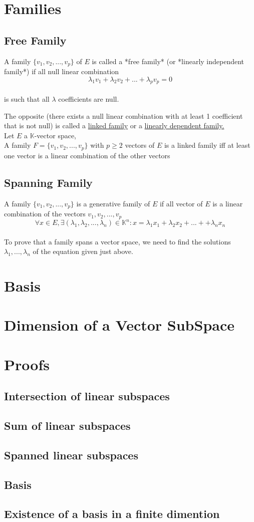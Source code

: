\documentclass[notitlepage]{math}
\begin{document}
\section{Families}
\subsection{Free Family}
A family $\{v_1,v_2,...,v_p\}$  of $E$ is called a *free family*  (or *linearly independent family*) if all null linear combination\\
\[\lambda_1v_1 + \lambda_2v_2 + ... + \lambda_pv_p = 0\]\\
is such that all $\lambda$ coefficients are null.

The opposite (there exists a null linear combination with at least 1 coefficient that is not null) is called a \underline{linked family} or a \underline{linearly dependent family.}\\

Let $E$ a $\mathbb{K}$-vector space,\\
A family $F = \{v_1,v_2,...,v_p\}$  with $p \geq 2$ vectors of $E$ is a linked family iff at least one vector is a linear combination of the other vectors

\subsection{Spanning Family}
A family $\{v_1,v_2,...,v_p\} $ is a generative family of $E$ if all vector of $E$ is a linear combination of the vectors $v_1,v_2,...,v_p$ \\
\[\forall x \in E, \exists (\lambda_1,\lambda_2,...,\lambda_n) \in \mathbb{K}^n: x =\lambda_1x_1 + \lambda_2x_2 + ... + + \lambda_nx_n\]\\
To prove that a family spans a vector space, we need to find the solutions $\lambda_1,...,\lambda_n$ of the equation given just above.
\section{Basis}
\section{Dimension of a Vector SubSpace}
\section{Proofs}
\subsection{Intersection of linear subspaces}
\subsection{Sum of linear subspaces}
\subsection{Spanned linear subspaces}
\subsection{Basis}
\subsection{Existence of a basis in a finite dimention}
\end{document}
